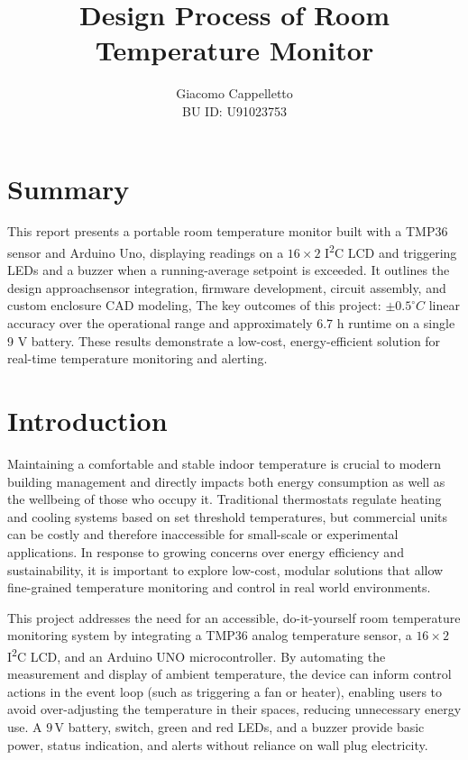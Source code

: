\documentclass[10pt]{article}
\title{Design Process of Room Temperature Monitor} \author{Giacomo Cappelletto\\ BU ID: U91023753} %
\date{}
\begin{document}
\maketitle

\section{Summary}

\noindent
This report presents a portable room temperature monitor built with a TMP36
sensor and Arduino Uno, displaying readings on a $16\times2$
I\textsuperscript{2}C LCD and triggering LEDs and a buzzer when a
running-average setpoint is exceeded. It outlines the design approachsensor
integration, firmware development, circuit assembly, and custom enclosure CAD
modeling, The key outcomes of this project: $\pm 0.5^{\circ}C$ linear accuracy
over the operational range and approximately 6.7 h runtime on a single 9 V
battery. These results demonstrate a low-cost, energy-efficient solution for
real-time temperature monitoring and alerting.
\section{Introduction}

Maintaining a comfortable and stable indoor temperature
is crucial to modern building management and directly impacts both energy
consumption as well as the wellbeing of those who occupy it. Traditional thermostats regulate heating and
cooling systems based on set threshold temperatures, but commercial units can be costly
and therefore inaccessible for small-scale or experimental applications. In response to
growing concerns over energy efficiency and sustainability, it is important to
explore low-cost, modular solutions that allow fine-grained temperature
monitoring and control in real world environments.

This project addresses the need for an accessible, do-it-yourself room
temperature monitoring system by integrating a TMP36 analog temperature sensor,
a $16\times 2$ I\textsuperscript{2}C LCD, and an Arduino UNO microcontroller. By
automating the measurement and display of ambient temperature, the device can
inform control actions in the event loop (such as triggering a fan or heater),
enabling users to avoid over-adjusting the temperature in their spaces, reducing
unnecessary energy use. A $9\,$V battery, switch, green and red LEDs, and a
buzzer provide basic power, status indication, and alerts without reliance on
wall plug electricity.
\end{document}
